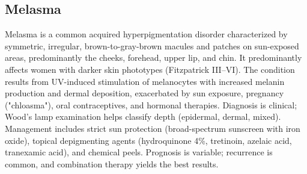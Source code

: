 



\label{sec:Pigmentary Disorders}

\subsection{Melasma}
\label{sec:Melasma}
Melasma is a common acquired hyperpigmentation disorder characterized by symmetric, irregular, brown-to-gray-brown macules and patches on sun-exposed areas, predominantly the cheeks, forehead, upper lip, and chin. It predominantly affects women with darker skin phototypes (Fitzpatrick III--VI). The condition results from UV-induced stimulation of melanocytes with increased melanin production and dermal deposition, exacerbated by sun exposure, pregnancy ("chloasma"), oral contraceptives, and hormonal therapies. Diagnosis is clinical; Wood's lamp examination helps classify depth (epidermal, dermal, mixed). Management includes strict sun protection (broad-spectrum sunscreen with iron oxide), topical depigmenting agents (hydroquinone 4\%, tretinoin, azelaic acid, tranexamic acid), and chemical peels. Prognosis is variable; recurrence is common, and combination therapy yields the best results.

